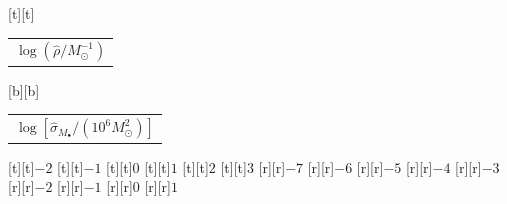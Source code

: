 %    
%
%
\begin{psfrags}%
\psfragscanon%
%
[t][t]{\color[rgb]{0,0,0}\setlength{\tabcolsep}{0pt}\begin{tabular}{c}{\Large$\log\left(\hat{\rho}/M_\odot^{-1}\right)$}\end{tabular}}%
[b][b]{\color[rgb]{0,0,0}\setlength{\tabcolsep}{0pt}\begin{tabular}{c}{\Large$\log\left[\hat{\sigma}_{M_\bullet}/\left(10^6 M_\odot^2\right)\right]$}\end{tabular}}%
%
[t][t]{$-2$}%
[t][t]{$-1$}%
[t][t]{$0$}%
[t][t]{$1$}%
[t][t]{$2$}%
[t][t]{$3$}%
%
[r][r]{$-7$}%
[r][r]{$-6$}%
[r][r]{$-5$}%
[r][r]{$-4$}%
[r][r]{$-3$}%
[r][r]{$-2$}%
[r][r]{$-1$}%
[r][r]{$0$}%
[r][r]{$1$}%
%
%
\end{psfrags}%
%
